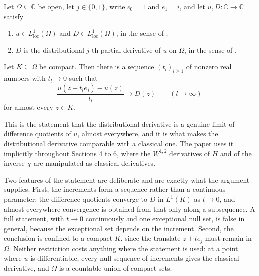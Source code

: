 \begin{lemma}
Let $\Omega\subseteq\mathbb{C}$ be open, let $j\in\{0,1\}$, write $e_0=1$ and
$e_1=i$, and let $u,D\colon\mathbb{C}\to\mathbb{C}$ satisfy
\begin{enumerate}
\item[(H1)] $u\in L^{1}_{\mathrm{loc}}(\Omega)$ and
  $D\in L^{1}_{\mathrm{loc}}(\Omega)$, in the sense of ;
\item[(H2)] $D$ is the distributional $j$-th partial derivative of $u$ on
  $\Omega$, in the sense of .
\end{enumerate}
Let $K\subseteq\Omega$ be compact.  Then there is a sequence $(t_l)_{l\ge1}$ of
nonzero real numbers with $t_l\to0$ such that
\[
  \frac{u(z+t_le_j)-u(z)}{t_l}\longrightarrow D(z)\qquad(l\to\infty)
\]
for almost every $z\in K$.

This is the statement that the distributional derivative is a genuine limit of
difference quotients of $u$, almost everywhere, and it is what makes the
distributional derivative comparable with a classical one.  The paper uses it
implicitly throughout Sections 4 to 6, where the $W^{1,2}$ derivatives of $H$
and of the inverse $\chi$ are manipulated as classical derivatives.

Two features of the statement are deliberate and are exactly what the
argument supplies.  First, the increments form a sequence rather than a
continuous parameter: the difference quotients converge to $D$ in
$L^{1}(K)$ as $t\to0$, and almost-everywhere convergence is obtained from
that only along a subsequence.  A full statement, with $t\to0$ continuously
and one exceptional null set, is false in general, because the exceptional
set depends on the increment.  Second, the conclusion is confined to a
compact $K$, since the translate $z+t e_j$ must remain in $\Omega$.  Neither
restriction costs anything where the statement is used: at a point where $u$
is differentiable, every null sequence of increments gives the classical
derivative, and $\Omega$ is a countable union of compact sets.
\end{lemma}
